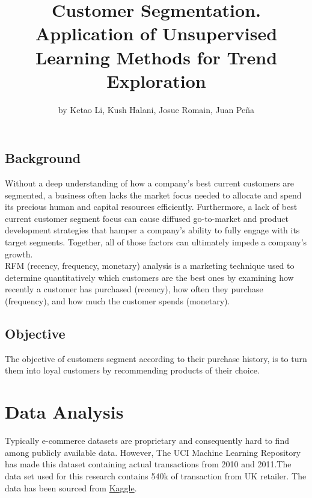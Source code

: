 \title{Customer Segmentation. Application of Unsupervised Learning Methods for
Trend Exploration}
\author{by Ketao Li, Kush Halani, Josue Romain, Juan Peña}

\maketitle


\hypertarget{background}{%
\subsection{Background}\label{background}}

Without a deep understanding of how a company's best current customers
are segmented, a business often lacks the market focus needed to
allocate and spend its precious human and capital resources efficiently.
Furthermore, a lack of best current customer segment focus can cause
diffused go-to-market and product development strategies that hamper a
company's ability to fully engage with its target segments. Together,
all of those factors can ultimately impede a company's growth.\\
RFM (recency, frequency, monetary) analysis is a marketing technique
used to determine quantitatively which customers are the best ones by
examining how recently a customer has purchased (recency), how often
they purchase (frequency), and how much the customer spends (monetary).

\hypertarget{objective}{%
\subsection{Objective}\label{objective}}

The objective of customers segment according to their purchase history,
is to turn them into loyal customers by recommending products of their
choice.

\hypertarget{data-analysis}{%
\section{Data Analysis}\label{data-analysis}}

Typically e-commerce datasets are proprietary and consequently hard to
find among publicly available data. However, The UCI Machine Learning
Repository has made this dataset containing actual transactions from
2010 and 2011.The data set used for this research contains 540k of
transaction from UK retailer. The data has been sourced from
\href{https://www.kaggle.com/carrie1/ecommerce-data}{Kaggle}.

